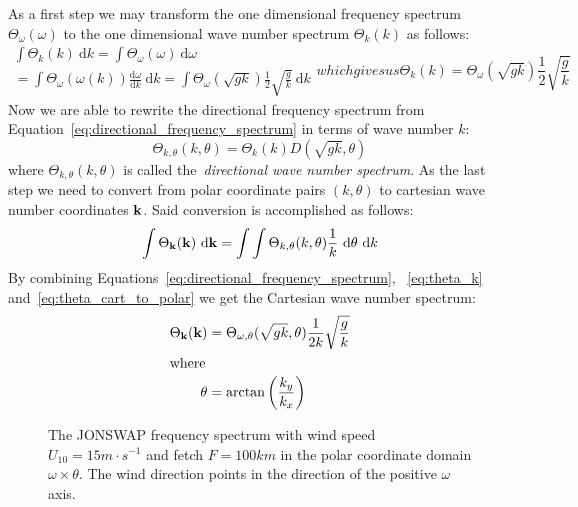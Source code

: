 As a first step we may transform the one dimensional frequency spectrum 
$\Theta_{\omega}(\omega)$ to the one dimensional wave number 
spectrum $\Theta_k(k)$ as follows:
\begin{subequations}
\begin{multline}
 \int\Theta_k(k)~\mathrm{d}k = \int\Theta_{\omega}(\omega)~\mathrm{d}\omega\\ = 
\int\Theta_{\omega}(\omega(k))\frac{\mathrm{d}\omega}{\mathrm{d}k}~\mathrm{d}k
= \int\Theta_{\omega}(\sqrt{gk})\frac{1}{2}\sqrt{\frac{g}{k}}~\mathrm{d}k
\end{multline}
which gives us
\begin{equation}
\label{eq:theta_k}
 \Theta_k(k) = \Theta_{\omega}(\sqrt{gk})\frac{1}{2}\sqrt{\frac{g}{k}}
\end{equation}
\end{subequations}
Now we are able to rewrite the directional frequency spectrum from 
Equation~\ref{eq:directional_frequency_spectrum} in terms of wave number $k$:
\begin{equation}
\label{eq:theta_k_polar}
 \Theta_{k,\theta}(k,\theta) = \Theta_k(k)D(\sqrt{gk},\theta)
\end{equation}
where $\Theta_{k,\theta}(k,\theta)$ is called the~\emph{directional wave number 
spectrum}. As the last step we need to convert from polar coordinate pairs 
$(k,\theta)$ to cartesian wave number coordinates $\mathbf{k}$. Said conversion 
is accomplished as follows:
\begin{equation}
\label{eq:theta_cart_to_polar}
\int\Theta_{\mathbf{k}}(\mathbf{k})~\mathrm{d}\mathbf{k} = 
\int\int\Theta_{k,\theta}(k,\theta)\frac{1}{k}~\mathrm{d}\theta~\mathrm{d}k
\end{equation}
By combining Equations~\ref{eq:directional_frequency_spectrum}, 
~\ref{eq:theta_k} and~\ref{eq:theta_cart_to_polar} we get the Cartesian wave 
number spectrum:
\begin{align}
\Theta_{\mathbf{k}}(\mathbf{k}) &= \Theta_{\omega,\theta}(\sqrt{gk}, 
\theta)\frac{1}{2k}\sqrt{\frac{g}{k}}\\
\intertext{where}
\theta &= \arctan\left(\frac{k_y}{k_x}\right)
\end{align}
%
\begin{figure}
\centering
{}
\caption{The JONSWAP frequency spectrum with wind speed $U_{10} = 15m\cdot 
s^{-1}$ and fetch $F = 100km$ in the polar coordinate domain $\omega \times 
\theta$. The wind direction points in the direction of the positive $\omega$ 
axis.}
\label{fig:brakdilala}
\end{figure}
